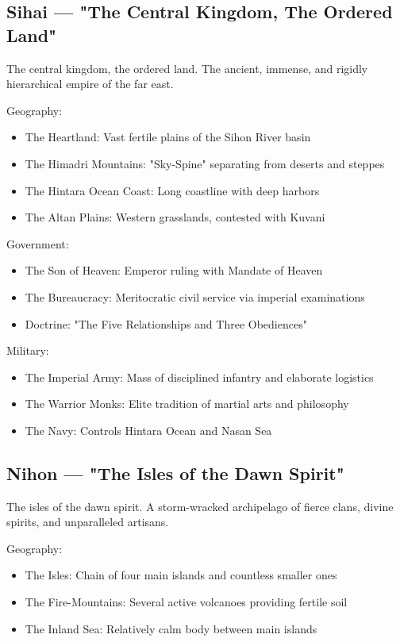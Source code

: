 \subsection{Sihai — "The Central Kingdom, The Ordered Land"}
\label{sec:sihai}

The central kingdom, the ordered land. The ancient, immense, and rigidly hierarchical empire of the far east.

Geography:
\begin{itemize}
    \item The Heartland: Vast fertile plains of the Sihon River basin
    \item The Himadri Mountains: "Sky-Spine" separating from deserts and steppes
    \item The Hintara Ocean Coast: Long coastline with deep harbors
    \item The Altan Plains: Western grasslands, contested with Kuvani
\end{itemize}

Government:
\begin{itemize}
    \item The Son of Heaven: Emperor ruling with Mandate of Heaven
    \item The Bureaucracy: Meritocratic civil service via imperial examinations
    \item Doctrine: "The Five Relationships and Three Obediences"
\end{itemize}

Military:
\begin{itemize}
    \item The Imperial Army: Mass of disciplined infantry and elaborate logistics
    \item The Warrior Monks: Elite tradition of martial arts and philosophy
    \item The Navy: Controls Hintara Ocean and Nasan Sea
\end{itemize}

\subsection{Nihon — "The Isles of the Dawn Spirit"}
\label{sec:nihon}

The isles of the dawn spirit. A storm-wracked archipelago of fierce clans, divine spirits, and unparalleled artisans.

Geography:
\begin{itemize}
    \item The Isles: Chain of four main islands and countless smaller ones
    \item The Fire-Mountains: Several active volcanoes providing fertile soil
    \item The Inland Sea: Relatively calm body between main islands
\end{itemize}

